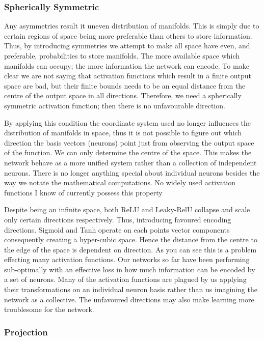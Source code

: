 \documentclass[onecolumn]{article}
\begin{document}
    \subsubsection{Spherically Symmetric}
    
    Any asymmetries result it uneven distribution of manifolds. This is simply due to certain regions of space being more preferable than others to store information. Thus, by introducing symmetries we attempt to make all space have even, and preferable, probabilities to store manifolds. The more available space which manifolds can occupy; the more information the network can encode. To make clear we are not saying that activation functions which result in a finite output space are bad, but their finite bounds needs to be an equal distance from the centre of the output space in all directions. Therefore, we need a spherically symmetric activation function; then there is no unfavourable direction.

    By applying this condition the coordinate system used no longer influences the distribution of manifolds in space, thus it is not possible to figure out which direction the basis vectors (neurons) point just from observing the output space of the function. We can only determine the centre of the space. This makes the network behave as a more unified system rather than a collection of independent neurons. There is no longer anything special about individual neurons besides the way we notate the mathematical computations. No widely used activation functions I know of currently possess this property
        
    Despite being an infinite space, both ReLU and Leaky-RelU collapse and scale only certain directions respectively. Thus, introducing favoured encoding directions. Sigmoid and Tanh operate on each points vector components consequently creating a hyper-cubic space. Hence the distance from the centre to the edge of the space is dependent on direction. As you can see this is a problem effecting many activation functions. Our networks so far have been performing sub-optimally with an effective loss in how much information can be encoded by a set of neurons. Many of the activation functions are plagued by us applying their transformations on an individual neuron basis rather than us imagining the network as a collective. The unfavoured directions may also make learning more troublesome for the network.

    \subsubsection{Projection}
        
\end{document}

